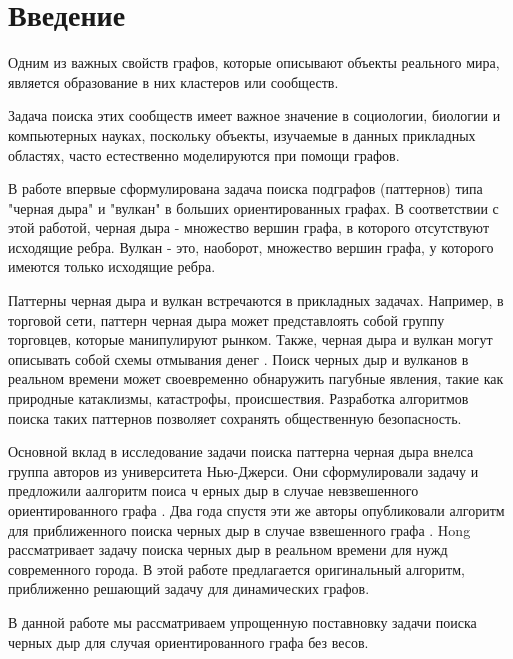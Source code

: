 \documentclass[12pt,a4paper,oneside]{article}
\theoremstyle{definition}
\theoremstyle{lemma}
\theoremstyle{remark}
\begin{document}
\setcounter{page}{2}

\tableofcontents
{}

\cleardoublepage
\section{Введение}\label{sec:otherintro}
Одним из важных свойств графов, которые описывают объекты реального мира,
является образование в них кластеров или сообществ.

Задача поиска этих сообществ имеет важное значение в социологии, биологии и компьютерных науках,
поскольку объекты, изучаемые в данных прикладных областях, часто естественно моделируются при
помощи графов. \cite{fortunato2010community}

В работе \cite{li2010detecting} впервые сформулирована задача поиска подграфов (паттернов) типа "черная дыра" и "вулкан" в больших ориентированных графах. В соответствии с этой работой, черная дыра - множество вершин графа, в которого отсутствуют исходящие ребра. Вулкан - это, наоборот, множество вершин графа, у которого имеются только исходящие ребра.

Паттерны черная дыра и вулкан встречаются в прикладных задачах. Например, в торговой сети, паттерн черная дыра может представлоять собой группу торговцев, которые манипулируют рынком. Также, черная дыра и вулкан могут описывать собой схемы отмывания денег \cite{semenov2017survey}. Поиск черных дыр и вулканов в реальном времени может  своевременно обнаружить пагубные явления, такие как природные катаклизмы, катастрофы, происшествия. Разработка алгоритмов поиска таких паттернов позволяет сохранять общественную безопасность. \cite{hong2015detecting}

Основной вклад в исследование задачи поиска паттерна черная дыра внелса группа авторов из университета Нью-Джерси. Они сформулировали задачу и предложили аалгоритм поиса ч ерных дыр в случае невзвешенного ориентированного графа \cite{li2010detecting}. Два  года спустя эти же авторы опубликовали алгоритм для приближенного поиска черных дыр в случае взвешенного графа \cite{li2012mining,li2014mining}. Hong \cite{hong2015detecting} рассматривает задачу поиска черных дыр в реальном времени для  нужд современного города. В этой работе предлагается оригинальный алгоритм, приближенно решающий задачу для динамических графов.

В данной работе мы рассматриваем упрощенную поставновку задачи поиска черных дыр для случая ориентированного графа без весов.
\end{document}
